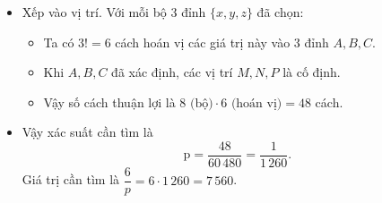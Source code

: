 \begin{ex}
{\begin{itemize}
\begin{itemize}
				\item Trường hợp $3$ đỉnh là các số thuộc tập chẵn $\{2, 4, 6, 8\}$.\\
				Số các bộ số chẵn lập thành cấp số cộng là $(2,4,6); (4,6,8)$.\\
				Số các cách chọn các đỉnh là $\mathrm{C}_4^3-2=2$.
			\end{itemize}
			Suy ra tổng số bộ 3 đỉnh hợp lệ là $6+2=8$ bộ.
			\item Xếp vào vị trí.
			Với mỗi bộ 3 đỉnh $\{x, y, z\}$ đã chọn:
			\begin{itemize}
				\item Ta có $3! = 6$ cách hoán vị các giá trị này vào $3$ đỉnh $A, B, C$.
				\item Khi $A, B, C$ đã xác định, các vị trí $M, N, P$ là cố định.
				\item Vậy số cách thuận lợi là $8 \text{ (bộ)} \cdot 6 \text{ (hoán vị)} = 48$ cách.
			\end{itemize}
			\item Vậy xác suất cần tìm là			
			$$\mathrm{p}=\dfrac{48}{60\,480}=\dfrac{1}{1\,260}.$$
			Giá trị cần tìm là $\dfrac{6}{p}=6\cdot 1\,260 = 7\,560$.
		\end{itemize}
	}
\end{ex}



